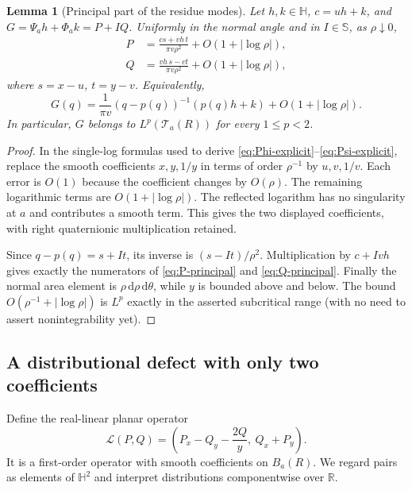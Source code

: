 \documentclass[11pt,a4paper]{article}
\numberwithin{equation}{section}
\newtheorem{lemma}[theorem]{Lemma}
\theoremstyle{definition}
\theoremstyle{remark}
\newcommand{\R}{\mathbb R}
\newcommand{\HH}{\mathbb H}
\newcommand{\SSS}{\mathbb S}
\newcommand{\dd}{\,\mathrm d}
\begin{document}
\begin{lemma}[Principal part of the residue modes]\label{lem:principal}
Let $h,k\in\HH$, $c=uh+k$, and
$G=\Psi_a h+\Phi_a k=P+IQ$. Uniformly in the normal angle and in
$I\in\SSS$, as $\rho\downarrow0$,
\begin{align}
 P&=\frac{cs+vh\,t}{\pi v\rho^2}+O(1+|\log\rho|),\label{eq:P-principal}\\
 Q&=\frac{vh\,s-ct}{\pi v\rho^2}+O(1+|\log\rho|),\label{eq:Q-principal}
\end{align}
where $s=x-u$, $t=y-v$. Equivalently,
\begin{equation}\label{eq:geometric-principal}
 G(q)=\frac1{\pi v}(q-p(q))^{-1}(p(q)h+k)
                        +O(1+|\log\rho|).
\end{equation}
In particular, $G$ belongs to $L^p(\mathcal T_a(R))$ for every
$1\le p<2$.
\end{lemma}
\begin{proof}
In the single-log formulas used to derive
\eqref{eq:Phi-explicit}--\eqref{eq:Psi-explicit}, replace the smooth
coefficients $x,y,1/y$ in terms of order $\rho^{-1}$ by $u,v,1/v$.
Each error is $O(1)$ because the coefficient changes by $O(\rho)$.
The remaining logarithmic terms are $O(1+|\log\rho|)$.
The reflected logarithm has no singularity at $a$ and contributes a
smooth term. This gives the two displayed coefficients, with right
quaternionic multiplication retained.

Since $q-p(q)=s+It$, its inverse is $(s-It)/\rho^2$. Multiplication by
$c+Ivh$ gives exactly the numerators of
\eqref{eq:P-principal} and \eqref{eq:Q-principal}. Finally the normal
area element is $\rho\dd\rho\dd\theta$, while $y$ is bounded above
and below. The bound $O(\rho^{-1}+|\log\rho|)$ is $L^p$ exactly in the
asserted subcritical range (with no need to assert nonintegrability yet).
\end{proof}

\subsection{A distributional defect with only two coefficients}
Define the real-linear planar operator
\begin{equation}\label{eq:L}
 \mathscr L(P,Q)=\left(P_x-Q_y-\frac{2Q}{y},\ Q_x+P_y\right).
\end{equation}
It is a first-order operator with smooth coefficients on $B_a(R)$.
We regard pairs as elements of $\HH^2$ and interpret distributions
componentwise over $\R$.
\end{document}
